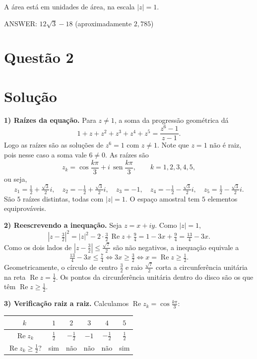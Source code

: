 \documentclass{article}%
\begin{document}
A área está em unidades de área, na escala $|z|=1$.

ANSWER: $12\sqrt{3}-18$ (aproximadamente $2{,}785$)%
\newpage%
\section*{Questão 2}

\section*{Solução}

\textbf{1) Raízes da equação.} Para $z\neq 1$, a soma da progressão geométrica dá
$$1+z+z^2+z^3+z^4+z^5=\frac{z^6-1}{z-1}.$$
Logo as raízes são as soluções de $z^6=1$ com $z\neq1$. Note que $z=1$ não é raiz, pois nesse caso a soma vale $6\neq0$. As raízes são
$$z_k=\cos\frac{k\pi}{3}+i\,\operatorname{sen}\frac{k\pi}{3},\qquad k=1,2,3,4,5,$$
ou seja,
$$z_1=\tfrac12+\tfrac{\sqrt3}{2}i,\quad z_2=-\tfrac12+\tfrac{\sqrt3}{2}i,\quad z_3=-1,\quad z_4=-\tfrac12-\tfrac{\sqrt3}{2}i,\quad z_5=\tfrac12-\tfrac{\sqrt3}{2}i.$$
São $5$ raízes distintas, todas com $|z|=1$. O espaço amostral tem $5$ elementos equiprováveis.

\textbf{2) Reescrevendo a inequação.} Seja $z=x+iy$. Como $|z|=1$,
$$\left|z-\tfrac32\right|^2=|z|^2-2\cdot\tfrac32\,\operatorname{Re}z+\tfrac94=1-3x+\tfrac94=\tfrac{13}{4}-3x.$$
Como os dois lados de $\left|z-\tfrac32\right|\le\tfrac{\sqrt7}{2}$ são não negativos, a inequação equivale a
$$\tfrac{13}{4}-3x\le\tfrac74\iff 3x\ge\tfrac32\iff x=\operatorname{Re}z\ge\tfrac12 .$$
Geometricamente, o círculo de centro $\tfrac32$ e raio $\tfrac{\sqrt7}{2}$ corta a circunferência unitária na reta $\operatorname{Re}z=\tfrac12$. Os pontos da circunferência unitária dentro do disco são os que têm $\operatorname{Re}z\ge \tfrac12$.

\textbf{3) Verificação raiz a raiz.} Calculamos $\operatorname{Re}z_k=\cos\frac{k\pi}{3}$:

\begin{center}
\begin{tabular}{c|c|c|c|c|c}
$k$ & $1$ & $2$ & $3$ & $4$ & $5$\\\hline
$\operatorname{Re}z_k$ & $\tfrac12$ & $-\tfrac12$ & $-1$ & $-\tfrac12$ & $\tfrac12$\\\hline
$\operatorname{Re}z_k\ge\tfrac12$? & sim & não & não & não & sim
\end{tabular}
\end{center}
\end{document}
